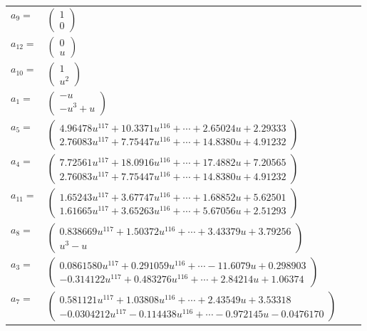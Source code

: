 \documentclass[1p]{elsarticle_modified}
\theoremstyle{definition}
\begin{document}
\begin{tabular}{m{7pt} m{180pt} m{7pt} m{180pt} }
\flushright $a_{9}=$&$\begin{pmatrix}1\\0\end{pmatrix}$ \\
\flushright $a_{12}=$&$\begin{pmatrix}0\\u\end{pmatrix}$ \\
\flushright $a_{10}=$&$\begin{pmatrix}1\\u^2\end{pmatrix}$ \\
\flushright $a_{1}=$&$\begin{pmatrix}- u\\- u^3+u\end{pmatrix}$ \\
\flushright $a_{5}=$&$\begin{pmatrix}4.96478 u^{117}+10.3371 u^{116}+\cdots+2.65024 u+2.29333\\2.76083 u^{117}+7.75447 u^{116}+\cdots+14.8380 u+4.91232\end{pmatrix}$ \\
\flushright $a_{4}=$&$\begin{pmatrix}7.72561 u^{117}+18.0916 u^{116}+\cdots+17.4882 u+7.20565\\2.76083 u^{117}+7.75447 u^{116}+\cdots+14.8380 u+4.91232\end{pmatrix}$ \\
\flushright $a_{11}=$&$\begin{pmatrix}1.65243 u^{117}+3.67747 u^{116}+\cdots+1.68852 u+5.62501\\1.61665 u^{117}+3.65263 u^{116}+\cdots+5.67056 u+2.51293\end{pmatrix}$ \\
\flushright $a_{8}=$&$\begin{pmatrix}0.838669 u^{117}+1.50372 u^{116}+\cdots+3.43379 u+3.79256\\u^3- u\end{pmatrix}$ \\
\flushright $a_{3}=$&$\begin{pmatrix}0.0861580 u^{117}+0.291059 u^{116}+\cdots-11.6079 u+0.298903\\-0.314122 u^{117}+0.483276 u^{116}+\cdots+2.84214 u+1.06374\end{pmatrix}$ \\
\flushright $a_{7}=$&$\begin{pmatrix}0.581121 u^{117}+1.03808 u^{116}+\cdots+2.43549 u+3.53318\\-0.0304212 u^{117}-0.114438 u^{116}+\cdots-0.972145 u-0.0476170\end{pmatrix}$ \\

\end{tabular}
\end{document}
